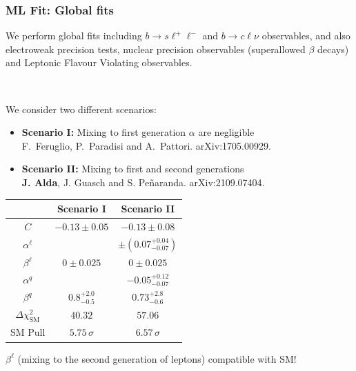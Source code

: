 \documentclass[mathserif, 10pt, dvipsnames]{beamer}
\newcommand\colorcite[1]{{\scriptsize\color{unizarblue}#1}}
\begin{document}
\begin{frame}\frametitle{ML Fit: Global fits}
    We perform global fits including $b\to s \ell^+\ell^-$ and
    $b\to c\ell\nu$ observables, and also electroweak precision tests,
    nuclear precision observables (superallowed $\beta$ decays) and Leptonic Flavour Violating observables.

    ~

    We consider two different scenarios:
    \begin{itemize}
\item \textbf{Scenario I:} Mixing to first generation $\alpha$ are negligible \\\colorcite{F.~Feruglio, P.~Paradisi and A.~Pattori. arXiv:1705.00929}.
\item \textbf{Scenario II:} Mixing to first and second generations \\{\scriptsize \color{red} \textbf{J. Alda}, J. Guasch and S. Peñaranda. arXiv:2109.07404}.
    \end{itemize}
    \begin{center}\small
        \begin{tabular}{|c|c|c|}\hline
                                        & Scenario I          & Scenario II                  \\\hline
            $C$                         & $-0.13 \pm 0.05$    & $-0.13 \pm 0.08$             \\\hline
            $\alpha^\ell$               &                     & $\pm (0.07^{+0.04}_{-0.07})$ \\\hline
            $\beta^\ell$                & $0 \pm 0.025$       & $0 \pm 0.025$                \\\hline
            $\alpha^q$                  &                     & $-0.05^{+0.12}_{-0.07}$      \\\hline
            $\beta^q$                   & $0.8^{+2.0}_{-0.5}$ & $0.73^{+2.8}_{-0.6}$         \\\hline
            $\Delta \chi^2_\mathrm{SM}$ & $40.32$             & $57.06$                      \\\hline
            SM Pull                     & $5.75\,\sigma$      & $6.57\,\sigma$               \\\hline
        \end{tabular}
    \end{center}

$\beta^\ell$ (mixing to the second generation of leptons) compatible with SM!
\end{frame}
\end{document}
